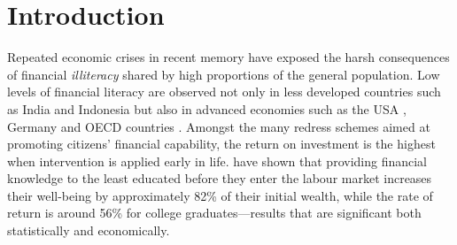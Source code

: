 \documentclass[a4paper,11pt,UKenglish,twoside,openright]{report}\usepackage[]{graphicx}\usepackage[]{color}
\begin{document}
\clearpage
\thispagestyle{empty}

\setcounter{page}{0} %


\chapter{Introduction}
\label{chp:1}



Repeated economic crises in recent memory have exposed the harsh consequences of financial \emph{illiteracy} shared by high proportions of the general population. Low levels of financial literacy are observed not only in less developed countries such as India and Indonesia \parencite{cole:2009} but also in advanced economies such as the USA \parencite{huston:2012}, Germany \parencite{bucherkoenen:2017} and OECD countries \parencite{lusardi:2015a}. Amongst the many redress schemes aimed at promoting citizens' financial capability, the return on investment is the highest when intervention is applied early in life. \textcite{lusardi:2014} have shown that providing financial knowledge to the least educated before they enter the labour market increases their well-being by approximately 82\% of their initial wealth, while the rate of return is around 56\% for college graduates---results that are significant both statistically and economically.
\end{document}
